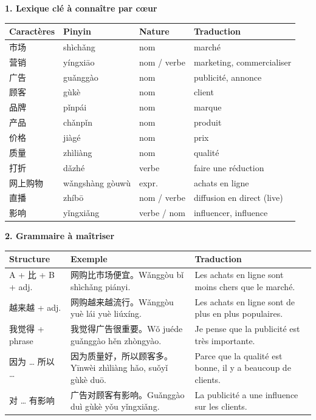 \documentclass[11pt]{article}
\begin{document}
\begin{bilan}
\textbf{1. Lexique clé à connaître par cœur}
\begin{center}
\begin{tabularx}{\linewidth}{|X|X|X|X|}
\hline
\rowcolor{popblueL} Caractères & Pinyin & Nature & Traduction \\
\hline
市场 & shìchǎng & nom & marché \\
\hline
营销 & yíngxiāo & nom / verbe & marketing, commercialiser \\
\hline
广告 & guǎnggào & nom & publicité, annonce \\
\hline
顾客 & gùkè & nom & client \\
\hline
品牌 & pǐnpái & nom & marque \\
\hline
产品 & chǎnpǐn & nom & produit \\
\hline
价格 & jiàgé & nom & prix \\
\hline
质量 & zhìliàng & nom & qualité \\
\hline
打折 & dǎzhé & verbe & faire une réduction \\
\hline
网上购物 & wǎngshàng gòuwù & expr. & achats en ligne \\
\hline
直播 & zhíbō & nom / verbe & diffusion en direct (live) \\
\hline
影响 & yǐngxiǎng & verbe / nom & influencer, influence \\
\hline
\end{tabularx}
\end{center}

\textbf{2. Grammaire à maîtriser}
\begin{center}
\begin{tabularx}{\linewidth}{|X|X|X|}
\hline
\rowcolor{popblueL} Structure & Exemple & Traduction \\
\hline
A + 比 + B + adj. & 网购比市场便宜。Wǎnggòu bǐ shìchǎng piányi. & Les achats en ligne sont moins chers que le marché. \\
\hline
越来越 + adj. & 网购越来越流行。Wǎnggòu yuè lái yuè liúxíng. & Les achats en ligne sont de plus en plus populaires. \\
\hline
我觉得 + phrase & 我觉得广告很重要。Wǒ juéde guǎnggào hěn zhòngyào. & Je pense que la publicité est très importante. \\
\hline
因为 … 所以 … & 因为质量好，所以顾客多。Yīnwèi zhìliàng hǎo, suǒyǐ gùkè duō. & Parce que la qualité est bonne, il y a beaucoup de clients. \\
\hline
对 … 有影响 & 广告对顾客有影响。Guǎnggào duì gùkè yǒu yǐngxiǎng. & La publicité a une influence sur les clients. \\
\hline
\end{tabularx}
\end{center}


\end{bilan}
\end{document}

